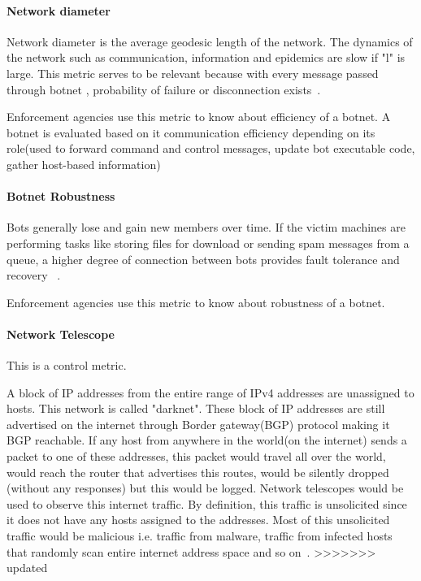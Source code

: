 \paragraph{ Network diameter }

Network diameter is the average geodesic length of the network.  The dynamics of the network such as communication, information and epidemics are slow if "l" is large. This metric serves to be relevant  because  with every message passed through botnet , probability of failure or disconnection exists~\cite{Strayer08botnetdetection}.

Enforcement agencies use this metric to know about efficiency of a botnet. A botnet is evaluated based on it communication efficiency depending on its role(used to forward command and control messages, update bot executable code, gather host-based information)

\paragraph{ Botnet Robustness }

Bots generally lose and gain new members over time. If the victim machines are performing  tasks like storing files for download or sending spam messages from a queue, a higher degree of connection  between bots provides fault tolerance and  recovery ~\cite{Strayer08botnetdetection}.

Enforcement agencies use this metric to know about robustness of a botnet.

\paragraph{Network Telescope}
This is a control metric.

A block of IP addresses from the entire range of IPv4 addresses are unassigned to hosts. This network is called "darknet". These block of IP addresses are still advertised on the internet through Border gateway(BGP) protocol making it BGP reachable. If any host from anywhere in the world(on the internet) sends a packet to one of these addresses, this packet would travel all over the world, would reach the router that advertises this routes, would be silently dropped (without any responses) but this would be logged. Network telescopes would be used to observe this internet traffic. By definition, this traffic is unsolicited since it does not have any hosts assigned to the addresses. Most of this unsolicited traffic would be malicious i.e. traffic from malware, traffic from infected hosts that randomly scan entire internet address space and so on~\cite{AM2014}.
>>>>>>> updated

